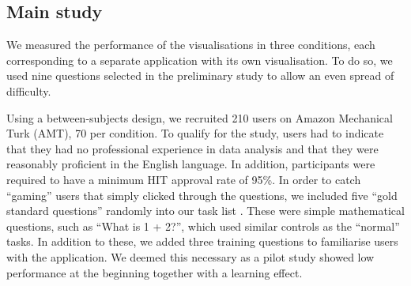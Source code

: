 \documentclass[final,5p,times,twocolumn,authoryear]{elsarticle}
\begin{document}





\subsection{Main study} %
\label{sec:main_study}

We measured the performance of the visualisations in three conditions, each corresponding to a separate application with its own visualisation. To do so, we used nine questions selected in the preliminary study to allow an even spread of difficulty. 

Using a between-subjects design, we recruited 210 users on Amazon Mechanical Turk (AMT), 70 per condition. To qualify for the study, users had to indicate that they had no professional experience in data analysis and that they were reasonably proficient in the English language. In addition, participants were required to have a minimum HIT approval rate of 95\%. In order to catch ``gaming'' users that simply clicked through the questions, we included five ``gold standard questions'' randomly into our task list \citep{wang_framework_2013}. These were simple mathematical questions, such as ``What is 1 + 2?'', which used similar controls as the ``normal'' tasks. In addition to these, we added three training questions to familiarise users with the application. We deemed this necessary as a pilot study showed low performance at the beginning together with a learning effect.
\end{document}
